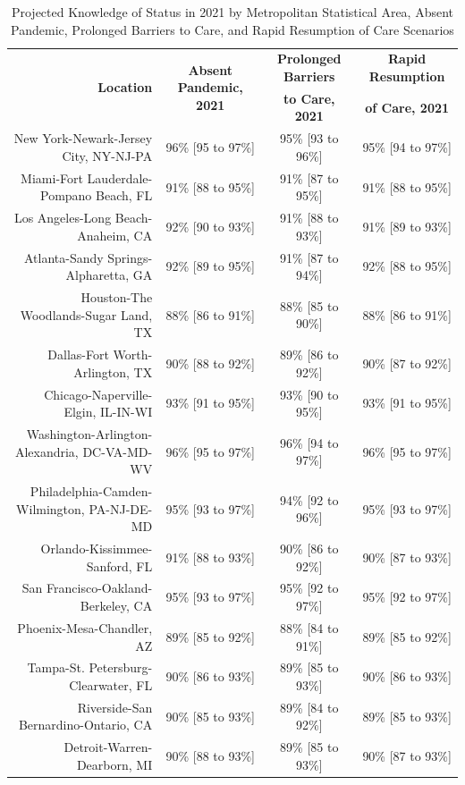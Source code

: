 \documentclass{article}
\begin{document}
\begin{table}[H]
	\caption{Projected Knowledge of Status in 2021 by Metropolitan Statistical Area, Absent Pandemic, Prolonged Barriers to Care, and Rapid Resumption of Care Scenarios}
	\footnotesize
	\begin{tabular}{|r|c|c|c|}
		\hline
		\multirow{2}{*}{\textbf{Location}} & \multirow{2}{*}{\textbf{Absent Pandemic, 2021}} & \textbf{Prolonged Barriers} & \textbf{Rapid Resumption}\\
		&  & \textbf{to Care, 2021} & \textbf{of Care, 2021}\\
		\hline\hline
		New York-Newark-Jersey City, NY-NJ-PA & 96\% [95 to 97\%] & 95\% [93 to 96\%] & 95\% [94 to 97\%]\\
		Miami-Fort Lauderdale-Pompano Beach, FL & 91\% [88 to 95\%] & 91\% [87 to 95\%] & 91\% [88 to 95\%]\\
		Los Angeles-Long Beach-Anaheim, CA & 92\% [90 to 93\%] & 91\% [88 to 93\%] & 91\% [89 to 93\%]\\
		Atlanta-Sandy Springs-Alpharetta, GA & 92\% [89 to 95\%] & 91\% [87 to 94\%] & 92\% [88 to 95\%]\\
		Houston-The Woodlands-Sugar Land, TX & 88\% [86 to 91\%] & 88\% [85 to 90\%] & 88\% [86 to 91\%]\\
		Dallas-Fort Worth-Arlington, TX & 90\% [88 to 92\%] & 89\% [86 to 92\%] & 90\% [87 to 92\%]\\
		Chicago-Naperville-Elgin, IL-IN-WI & 93\% [91 to 95\%] & 93\% [90 to 95\%] & 93\% [91 to 95\%]\\
		Washington-Arlington-Alexandria, DC-VA-MD-WV & 96\% [95 to 97\%] & 96\% [94 to 97\%] & 96\% [95 to 97\%]\\
		Philadelphia-Camden-Wilmington, PA-NJ-DE-MD & 95\% [93 to 97\%] & 94\% [92 to 96\%] & 95\% [93 to 97\%]\\
		Orlando-Kissimmee-Sanford, FL & 91\% [88 to 93\%] & 90\% [86 to 92\%] & 90\% [87 to 93\%]\\
		San Francisco-Oakland-Berkeley, CA & 95\% [93 to 97\%] & 95\% [92 to 97\%] & 95\% [92 to 97\%]\\
		Phoenix-Mesa-Chandler, AZ & 89\% [85 to 92\%] & 88\% [84 to 91\%] & 89\% [85 to 92\%]\\
		Tampa-St. Petersburg-Clearwater, FL & 90\% [86 to 93\%] & 89\% [85 to 93\%] & 90\% [86 to 93\%]\\
		Riverside-San Bernardino-Ontario, CA & 90\% [85 to 93\%] & 89\% [84 to 92\%] & 89\% [85 to 93\%]\\
		Detroit-Warren-Dearborn, MI & 90\% [88 to 93\%] & 89\% [85 to 93\%] & 90\% [87 to 93\%]\\

\end{tabular}
\end{table}
\end{document}
